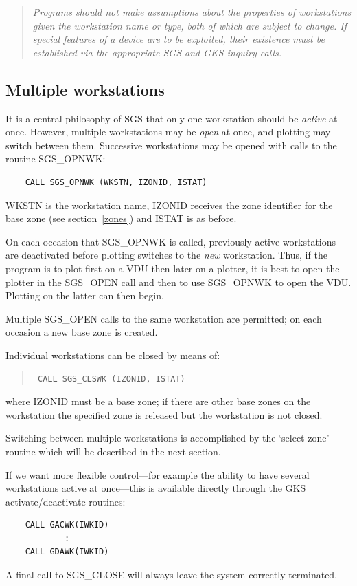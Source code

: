 \documentclass[11pt]{article}
\newcommand{\hyperref}[4]{#2\ref{#4}#3}
\newcommand{\htmlref}[2]{#1}
\begin{document}
\begin{quote}
{\em Programs should not make assumptions about the properties
of workstations given the workstation name or type, both of which are subject
to change.  If special features of a device are to be exploited, their 
existence must be established via the appropriate SGS and GKS inquiry calls.}
\end{quote}

\subsection {Multiple workstations}\label{sec-mult-ws}

It is a central philosophy of SGS that only one workstation should be
{\em active}\/ at once.
However, multiple workstations may be {\em open}\/ at once, and plotting may
switch between them.
Successive workstations may be opened with calls to the routine 
\htmlref{SGS\_OPNWK}{SGS_OPNWK}:
\begin{verbatim}
    CALL SGS_OPNWK (WKSTN, IZONID, ISTAT)
\end{verbatim}
WKSTN is the
\htmlref{workstation name}{sec-op-cl}, IZONID receives the zone
identifier for the base zone (see 
\hyperref{this section}{section~}{}{zones}) and ISTAT is as before.

On each occasion that SGS\_OPNWK is called, previously
active workstations are deactivated before plotting switches
to the {\em new}\/ workstation.  Thus, if the program is to plot
first on a VDU then later on a plotter, it is best to open the
plotter in the \htmlref{SGS\_OPEN}{SGS_OPEN}
call and then to use SGS\_OPNWK to open
the VDU.  Plotting on the latter can then begin.

Multiple SGS\_OPEN calls to the same workstation are permitted;  on
each occasion a new base zone is created.

Individual workstations can be closed by means of:
\begin{quote}{\tt
    CALL \htmlref{SGS\_CLSWK}{SGS_CLSWK} (IZONID, ISTAT)}
\end{quote}
where IZONID must be a base zone; if there are other base zones on the
workstation the specified zone is released but the workstation is not closed.

Switching between multiple workstations is accomplished by the `select
zone' routine which will be described in the 
\htmlref{next}{zones} section.

If we want more flexible control---for example the ability to have several
workstations active at once---this is available
directly through the GKS activate/deactivate routines:
\begin{verbatim}
    CALL GACWK(IWKID)
            :
    CALL GDAWK(IWKID)
\end{verbatim}
A final call to \htmlref{SGS\_CLOSE}{SGS_CLOSE}
will always leave the system correctly terminated.  
\end{document}
